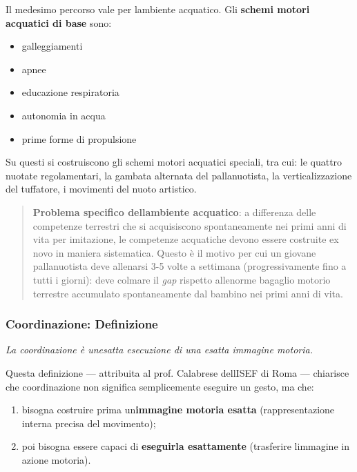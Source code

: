 \documentclass[a4paper,11pt]{article}
\providecommand{\tightlist}{%
  \setlength{\itemsep}{0pt}\setlength{\parskip}{0pt}}
\begin{document}
Il medesimo percorso vale per l\textquotesingle ambiente acquatico. Gli
\textbf{schemi motori acquatici di base} sono:

\begin{itemize}
      \tightlist
      \item
            galleggiamenti
      \item
            apnee
      \item
            educazione respiratoria
      \item
            autonomia in acqua
      \item
            prime forme di propulsione
\end{itemize}

Su questi si costruiscono gli schemi motori acquatici speciali, tra cui:
le quattro nuotate regolamentari, la gambata alternata del
pallanuotista, la verticalizzazione del tuffatore, i movimenti del nuoto
artistico.

\begin{quote}
      \textbf{Problema specifico dell\textquotesingle ambiente acquatico}: a
      differenza delle competenze terrestri che si acquisiscono spontaneamente
      nei primi anni di vita per imitazione, le competenze acquatiche devono
      essere costruite ex novo in maniera sistematica. Questo è il motivo per
      cui un giovane pallanuotista deve allenarsi 3-5 volte a settimana
      (progressivamente fino a tutti i giorni): deve colmare il \emph{gap}
      rispetto all\textquotesingle enorme bagaglio motorio terrestre
      accumulato spontaneamente dal bambino nei primi anni di vita.
\end{quote}

\subsubsection{Coordinazione:
      Definizione}\label{coordinazione-definizione}

\emph{La coordinazione è un\textquotesingle esatta esecuzione di una
      esatta immagine motoria.}

Questa definizione --- attribuita al prof. Calabrese
dell\textquotesingle ISEF di Roma --- chiarisce che coordinazione non
significa semplicemente eseguire un gesto, ma che:

\begin{enumerate}
      \tightlist
      \item
            bisogna costruire prima un\textquotesingle{}\textbf{immagine motoria
                  esatta} (rappresentazione interna precisa del movimento);
      \item
            poi bisogna essere capaci di \textbf{eseguirla esattamente}
            (trasferire l\textquotesingle immagine in azione motoria).
\end{enumerate}
\end{document}
